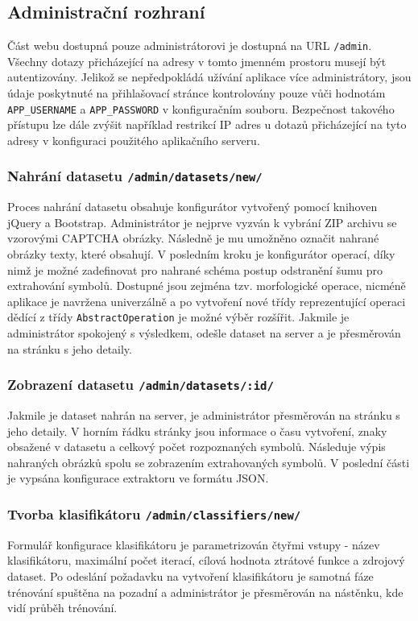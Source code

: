 \documentclass[
  master=true,
  biblatex,
  glossaries,
  index
]{kidiplom}
\begin{document}
\subsection{Administrační rozhraní}
Část webu dostupná pouze administrátorovi je dostupná na URL \texttt{/admin}. Všechny dotazy přicházející na adresy v tomto jmenném prostoru musejí být autentizovány. Jelikož se nepředpokládá užívání aplikace více administrátory, jsou údaje poskytnuté na přihlašovací stránce kontrolovány pouze vůči hodnotám \texttt{APP\_USERNAME} a \texttt{APP\_PASSWORD} v konfiguračním souboru. Bezpečnost takového přístupu lze dále zvýšit například restrikcí IP adres u dotazů přicházející na tyto adresy v konfiguraci použitého aplikačního serveru.

\subsubsection*{Nahrání datasetu \texttt{/admin/datasets/new/}}
Proces nahrání datasetu obsahuje konfigurátor vytvořený pomocí knihoven jQuery a  Bootstrap. Administrátor je nejprve vyzván k vybrání ZIP archivu se vzorovými CAPTCHA obrázky. Následně je mu umožněno označit nahrané obrázky texty, které obsahují. V posledním kroku je konfigurátor operací, díky nimž je možné zadefinovat pro nahrané schéma postup odstranění šumu pro extrahování symbolů. Dostupné jsou zejména tzv. morfologické operace, nicméně aplikace je navržena univerzálně a po vytvoření nové třídy reprezentující operaci dědící z třídy \texttt{AbstractOperation} je možné výběr rozšířit. Jakmile je administrátor spokojený s výsledkem, odešle dataset na server a je přesměrován na stránku s jeho detaily.
\subsubsection*{Zobrazení datasetu \texttt{/admin/datasets/:id/}}
Jakmile je dataset nahrán na server, je administrátor přesměrován na stránku s jeho detaily. V horním řádku stránky jsou informace o času vytvoření, znaky obsažené v datasetu a celkový počet rozpoznaných symbolů. Následuje výpis nahraných obrázků spolu se zobrazením extrahovaných symbolů. V poslední části je vypsána konfigurace extraktoru ve formátu JSON. 

\subsubsection*{Tvorba klasifikátoru \texttt{/admin/classifiers/new/}}
Formulář konfigurace klasifikátoru je parametrizován čtyřmi vstupy - název klasifikátoru, maximální počet iterací, cílová hodnota ztrátové funkce a zdrojový dataset. Po odeslání požadavku na vytvoření klasifikátoru je samotná fáze trénování spuštěna na pozadní a administrátor je přesměrován na nástěnku, kde vidí průběh trénování.
\end{document}
